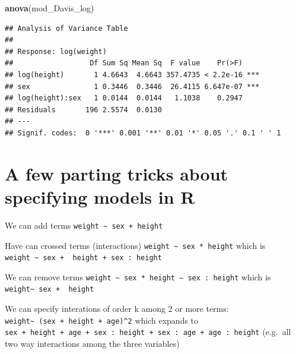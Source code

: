 \documentclass[
]{book}
\newenvironment{Shaded}{\begin{snugshade}}{\end{snugshade}}
\newcommand{\FunctionTok}[1]{\textcolor[rgb]{0.13,0.29,0.53}{\textbf{#1}}}
\newcommand{\NormalTok}[1]{#1}
\begin{document}
\begin{Shaded}
\begin{Highlighting}[]
\FunctionTok{anova}\NormalTok{(mod\_Davis\_log)}
\end{Highlighting}
\end{Shaded}

\begin{verbatim}
## Analysis of Variance Table
## 
## Response: log(weight)
##                  Df Sum Sq Mean Sq  F value    Pr(>F)    
## log(height)       1 4.6643  4.6643 357.4735 < 2.2e-16 ***
## sex               1 0.3446  0.3446  26.4115 6.647e-07 ***
## log(height):sex   1 0.0144  0.0144   1.1038    0.2947    
## Residuals       196 2.5574  0.0130                       
## ---
## Signif. codes:  0 '***' 0.001 '**' 0.01 '*' 0.05 '.' 0.1 ' ' 1
\end{verbatim}

\section{A few parting tricks about specifying models in R}\label{a-few-parting-tricks-about-specifying-models-in-r}

We can add terms
\texttt{weight\ \textasciitilde{}\ sex\ +\ height}

Have can crossed terms (interactions)
\texttt{weight\ \textasciitilde{}\ sex\ *\ height} which is \texttt{weight\ \textasciitilde{}\ sex\ +\ \ height\ +\ sex\ :\ height}

We can remove terms
\texttt{weight\ \textasciitilde{}\ sex\ *\ height\ –\ sex\ :\ height} which is \texttt{weight\textasciitilde{}\ sex\ +\ \ height}

We can specify interations of order k among 2 or more terms:
\texttt{weight\textasciitilde{}\ (sex\ +\ height\ +\ age)\^{}2} which expands to \texttt{sex\ +\ height\ +\ age\ +\ sex\ :\ height\ +\ sex\ :\ age\ +\ age\ :\ height} (e.g.~all two way interactions among the three variables)
\end{document}
